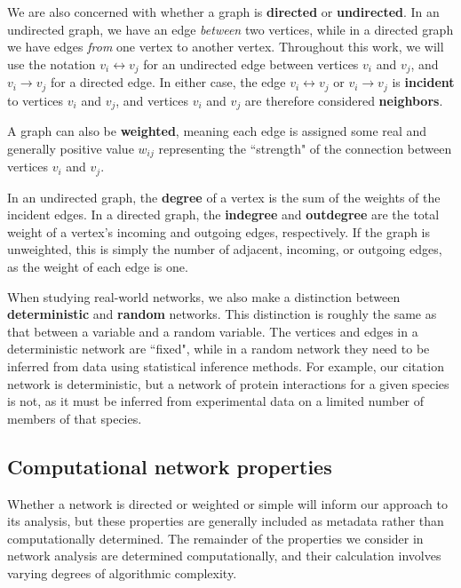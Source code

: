 \documentclass[12pt]{thesis}
\theoremstyle{plain}
\theoremstyle{definition}
\theoremstyle{remark}
\begin{document}
We are also concerned with whether a graph is \textbf{directed} or \textbf{undirected}. In an undirected graph, we have an edge \textit{between} two vertices, while in a directed graph we have edges \textit{from} one vertex to another vertex. Throughout this work, we will use the notation $v_i \leftrightarrow v_j$ for an undirected edge between vertices $v_i$ and $v_j$, and $v_i \rightarrow v_j$ for a directed edge. In either case, the edge $v_i\leftrightarrow v_j$ or $v_i\rightarrow v_j$ is \textbf{incident} to vertices $v_i$ and $v_j$, and vertices $v_i$ and $v_j$ are therefore considered \textbf{neighbors}.

A graph can also be \textbf{weighted}, meaning each edge is assigned some real and generally positive value $w_{ij}$ representing the ``strength" of the connection between vertices $v_i$ and $v_j$. 

In an undirected graph, the \textbf{degree} of a vertex is the sum of the weights of the incident edges. In a directed graph, the \textbf{indegree} and \textbf{outdegree} are the total weight of a vertex's incoming and outgoing edges, respectively. If the graph is unweighted, this is simply the number of adjacent, incoming, or outgoing edges, as the weight of each edge is one.

When studying real-world networks, we also make a distinction between \textbf{deterministic} and \textbf{random} networks. This distinction is roughly the same as that between a variable and a random variable. The vertices and edges in a deterministic network are ``fixed", while in a random network they need to be inferred from data using statistical inference methods. For example, our citation network is deterministic, but a network of protein interactions for a given species is not, as it must be inferred from experimental data on a limited number of members of that species.

\subsection{Computational network properties}
Whether a network is directed or weighted or simple will inform our approach to its analysis, but these properties are generally included as metadata rather than computationally determined. The remainder of the properties we consider in network analysis are determined computationally, and their calculation involves varying degrees of algorithmic complexity.
\end{document}
